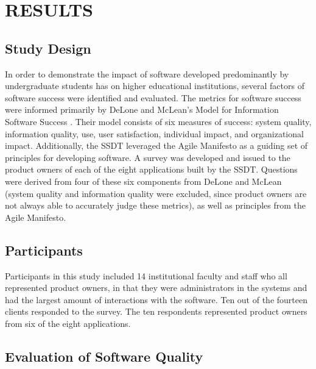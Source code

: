 \section{RESULTS}

\subsection{Study Design}
In order to demonstrate the impact of software developed predominantly by undergraduate students has on higher educational institutions, several factors of software success were identified and evaluated.  The metrics for software success were informed primarily by DeLone and McLean's Model for Information Software Success \cite{delone1992softwaresuccess}. Their model consists of six measures of success: system quality, information quality, use, user satisfaction, individual impact, and organizational impact. Additionally, the SSDT leveraged the Agile Manifesto \cite{agilemanifesto} as a guiding set of principles for developing software. A survey was developed and issued to the product owners of each of the eight applications built by the SSDT. Questions were derived from four of these six components from DeLone and McLean (system quality and information quality were excluded, since product owners are not always able to accurately judge these metrics), as well as principles from the Agile Manifesto. %

\subsection{Participants}
Participants in this study included 14 institutional faculty and staff who all represented product owners, in that they were administrators in the systems and had the largest amount of interactions with the software. Ten out of the fourteen clients responded to the survey. The ten respondents represented product owners from six of the eight applications. 

\subsection{Evaluation of Software Quality}
